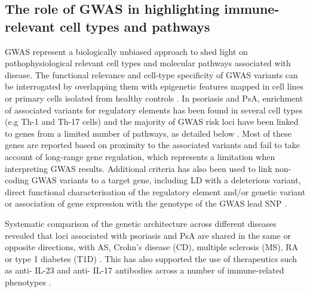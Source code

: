 \subsection{The role of GWAS in highlighting immune-relevant cell types and pathways}

GWAS represent a biologically unbiased approach to shed light on pathophysiological relevant cell types and molecular pathways associated with disease. The functional relevance and cell-type specificity of GWAS variants can be interrogated by overlapping them with epigenetic features mapped in cell lines or primary cells isolated from healthy controls \parencite{Farh2015}. In psoriasis and PsA, enrichment of associated variants for regulatory elements has been found in several cell types (e.g Th-1 and Th-17 cells) and the majority of GWAS risk loci have been linked to genes from a limited number of pathways, as detailed below \parencite{Tsoi2017,Capon2017}. Most of these genes are reported based on proximity to the associated variants and fail to take account of long-range gene regulation, which represents a limitation when interpreting GWAS results. Additional criteria has also been used to link non-coding GWAS variants to a target gene, including LD with a deleterious variant, direct functional characterisation of the regulatory element and/or genetic variant or association of gene expression with the genotype of the GWAS lead SNP \parencite{Capon2008,Tsoi2012,Tsoi2017,Meglio2011}.

Systematic comparison of the genetic architecture across different diseases revealed that loci associated with psoriasis and PsA are shared in the same or opposite directions, with AS, Crohn’s disease (CD), multiple sclerosis (MS), RA or type 1 diabetes (T1D) \parencite{Tsoi2012}. This has also supported the use of therapeutics such as anti- IL-23 and anti- IL-17 antibodies across a number of immune-related phenotypes \parencite{Visscher2017}.






